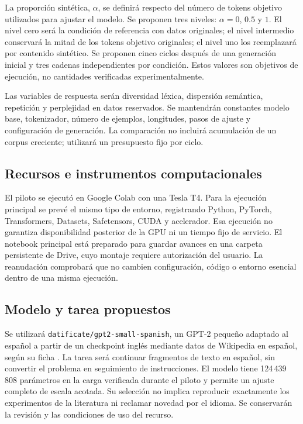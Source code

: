 \documentclass[12pt,letterpaper]{article}
\begin{document}
La proporción sintética, \(\alpha\), se definirá respecto del número de
tokens objetivo utilizados para ajustar el modelo. Se proponen tres niveles:
\(\alpha=0\), \(0.5\) y \(1\). El nivel cero será la condición de referencia
con datos originales; el nivel intermedio conservará la mitad de los tokens
objetivo originales; el nivel uno los reemplazará por contenido sintético.
Se proponen cinco ciclos después de una generación inicial y tres cadenas
independientes por condición. Estos valores son objetivos de ejecución,
no cantidades verificadas experimentalmente.

Las variables de respuesta serán diversidad léxica, dispersión semántica,
repetición y perplejidad en datos reservados. Se mantendrán constantes
modelo base, tokenizador, número de ejemplos, longitudes, pasos de ajuste
y configuración de generación. La comparación no incluirá acumulación de
un corpus creciente; utilizará un presupuesto fijo por ciclo.

\subsection{Recursos e instrumentos computacionales}

El piloto se ejecutó en Google Colab con una Tesla T4. Para la ejecución
principal se prevé el mismo tipo de entorno, registrando Python, PyTorch,
Transformers, Datasets, Safetensors, CUDA y acelerador. Esa ejecución no
garantiza disponibilidad posterior de la GPU ni un tiempo fijo de servicio.
El notebook principal está preparado para guardar avances en una carpeta
persistente de Drive, cuyo montaje requiere autorización del usuario.
La reanudación comprobará que no cambien configuración, código o entorno
esencial dentro de una misma ejecución.

\subsection{Modelo y tarea propuestos}

Se utilizará \texttt{datificate/gpt2-small-spanish}, un GPT-2 pequeño
adaptado al español a partir de un checkpoint inglés mediante datos de
Wikipedia en español, según su ficha \cite{spanishmodelcard}. La tarea
será continuar fragmentos de texto en español, sin convertir el problema
en seguimiento de instrucciones. El modelo tiene 124\,439\,808 parámetros
en la carga verificada durante el piloto y permite un ajuste completo
de escala acotada. Su selección no implica reproducir exactamente los
experimentos de la literatura ni reclamar novedad por el idioma.
Se conservarán la revisión y las condiciones de uso del recurso.
\end{document}
